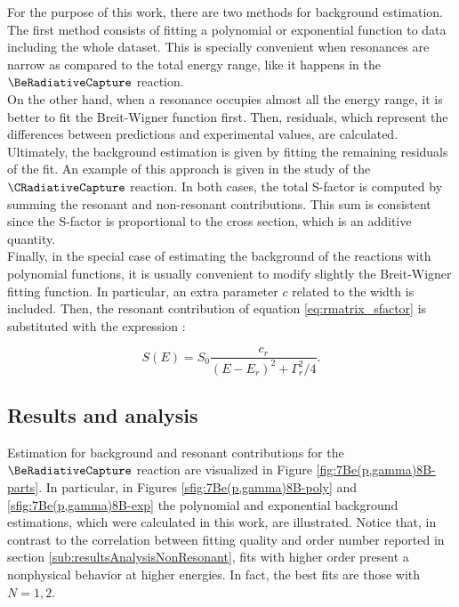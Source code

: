\documentclass[openany]{book}
\begin{document}
For the purpose of this work, there are two methods for background estimation. The first method consists of fitting a polynomial or exponential function to data including the whole dataset. This is specially convenient when resonances are narrow as compared to the total energy range, like it happens in the $\BeRadiativeCapture$ reaction.  \\

On the other hand, when a resonance occupies almost all the energy range, it is better to fit the Breit-Wigner function first. Then, residuals, which represent the differences between predictions and experimental values, are calculated. Ultimately, the background estimation is given by fitting the remaining residuals of the fit. An example of this approach is given in the study of the $\CRadiativeCapture$ reaction. In both cases, the total S-factor is computed by summing the resonant and non-resonant contributions. This sum is consistent since the S-factor is proportional to the cross section, which is an additive quantity. \\

Finally, in the special case of estimating the background of the reactions with polynomial functions, it is usually convenient to modify slightly the Breit-Wigner fitting function. In particular, an extra parameter $c$ related to the width is included. Then, the resonant contribution of equation \ref{eq:rmatrix_sfactor} is substituted with the expression \cite{sparta_pizzone_bertulani_hou_lamia_tumino_2020}:

\begin{equation}\label{eq:rmatrix_sfactor_modified}
	S(E) = S_0 \frac{c_r}{(E - E_r)^2 + \Gamma_r^2/4}. 
\end{equation}

\subsection{Results and analysis} \label{sub:resultsAnalysisResonant}

Estimation for background and resonant contributions for the $\BeRadiativeCapture$ reaction are visualized in Figure \ref{fig:7Be(p,gamma)8B-parts}. In particular, in Figures \ref{sfig:7Be(p,gamma)8B-poly} and \ref{sfig:7Be(p,gamma)8B-exp} the polynomial and exponential background estimations, which were calculated in this work, are illustrated. Notice that, in contrast to the correlation between fitting quality and order number reported in section \ref{sub:resultsAnalysisNonResonant}, fits with higher order present a nonphysical behavior at higher energies. In fact, the best fits are those with $N = 1, 2$.  \\
\end{document}

